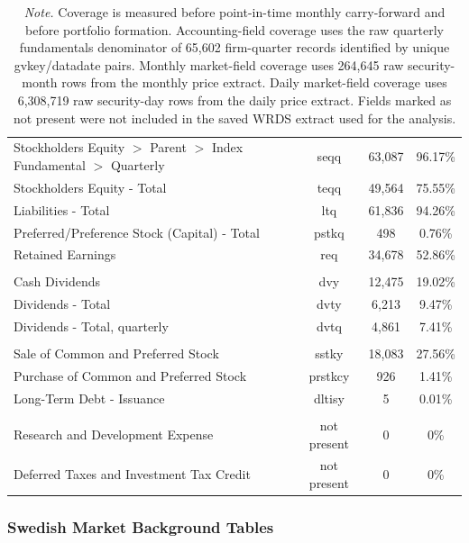 \documentclass[11pt]{article}
\newcommand{\repo}[1]{\textnormal{\small #1}}
\newcommand{\tablenote}[1]{\caption*{\footnotesize \textit{Note.} #1}}
\begin{document}
\begin{table}[H]
\begin{tabularx}{\textwidth}{>{\raggedright\arraybackslash}X c c c}
Stockholders Equity $>$ Parent $>$ Index Fundamental $>$ Quarterly & seqq & 63,087 & 96.17\% \\
Stockholders Equity - Total & teqq & 49,564 & 75.55\% \\
Liabilities - Total & ltq & 61,836 & 94.26\% \\
Preferred/Preference Stock (Capital) - Total & pstkq & 498 & 0.76\% \\
Retained Earnings & req & 34,678 & 52.86\% \\
\midrule
\multicolumn{4}{l}{\textit{Dividend fields}} \\
Cash Dividends & dvy & 12,475 & 19.02\% \\
Dividends - Total & dvty & 6,213 & 9.47\% \\
Dividends - Total, quarterly & dvtq & 4,861 & 7.41\% \\
\midrule
\multicolumn{4}{l}{\textit{External-finance fields}} \\
Sale of Common and Preferred Stock & sstky & 18,083 & 27.56\% \\
Purchase of Common and Preferred Stock & prstkcy & 926 & 1.41\% \\
Long-Term Debt - Issuance & dltisy & 5 & 0.01\% \\
\midrule
\multicolumn{4}{l}{\textit{Fields not present in the extract}} \\
Research and Development Expense & not present & 0 & 0\% \\
Deferred Taxes and Investment Tax Credit & not present & 0 & 0\% \\
\bottomrule
\end{tabularx}
\tablenote{Coverage is measured before point-in-time monthly carry-forward and before portfolio formation. Accounting-field coverage uses the raw quarterly fundamentals denominator of 65,602 firm-quarter records identified by unique \repo{gvkey}/\repo{datadate} pairs. Monthly market-field coverage uses 264,645 raw security-month rows from the monthly price extract. Daily market-field coverage uses 6,308,719 raw security-day rows from the daily price extract. Fields marked as not present were not included in the saved WRDS extract used for the analysis.}
\end{table}


\subsubsection{Swedish Market Background Tables}
\end{document}
